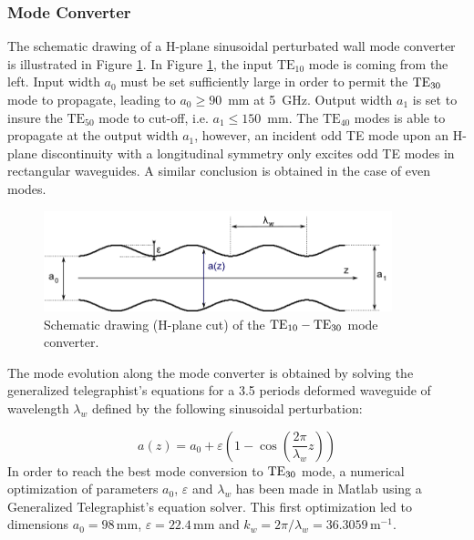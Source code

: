\subsubsection{Mode Converter}
The schematic drawing of a H-plane sinusoidal perturbated wall mode converter is illustrated in Figure \ref{fig:SchematicMC}. In Figure \ref{fig:SchematicMC}, the input $\mbox{TE}_{10}$ mode is coming from the left. Input width $a_{0}$ must be set sufficiently large in order to permit the ${\mathrm{TE}}_{30}$ mode to propagate, leading to $a_{0}\geqslant90$~mm at 5~GHz. Output width $a_{1}$ is set to insure the $\mbox{T}\mbox{E}_{50}$ mode to cut-off, i.e. $a_{1}\leqslant150$~mm. The $\mbox{TE}_{40}$ modes is able to propagate at the output width $a_{1}$, however, an incident odd TE mode upon an H-plane discontinuity
with a longitudinal symmetry only excites odd TE modes in rectangular waveguides. A similar conclusion is obtained in the case of even modes.  

\begin{figure}[h]
	\includegraphics[width=0.9\textwidth]{figures/chap3/ITER_modeconverter/MC_SchematicCM}
	\caption{Schematic drawing (H-plane cut) of the ${\mathrm{TE}}_{10}-{\mathrm{TE}}_{30}$
		mode converter. }
	\label{fig:SchematicMC}
\end{figure}

The mode evolution along the mode converter is obtained by solving the generalized telegraphist's equations for a 3.5 periods deformed waveguide of wavelength $\lambda_{w}$ defined by the following sinusoidal
perturbation\cite{buckley1990, bibet1994}:

\begin{equation}
a(z)=a_{0}+\varepsilon\left(1-\cos\left(\frac{2\pi}{\lambda_{w}}z\right)\right)\label{eq:sinusoidalPerturbation}
\end{equation}
In order to reach the best mode conversion to ${\mathrm{TE}}_{30}$ mode, a numerical optimization of parameters $a_{0}$, $\varepsilon$ and $\lambda_{w}$ has been made in Matlab using a Generalized Telegraphist's equation solver. This first optimization led to dimensions $a_{0}=98$\,mm, $\varepsilon=22.4$\,mm and $k_{w}=2\pi/\lambda_{w}=36.3059\,\mbox{m}^{-1}$.

